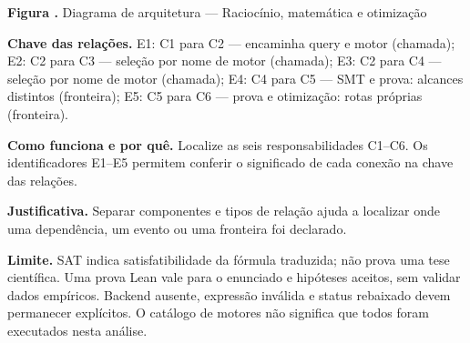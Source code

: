 {\small\textbf{Figura \thefigure.} Diagrama de arquitetura --- Raciocínio, matemática e otimização}\par\smallskip
{\footnotesize\textbf{Chave das relações.} E1: C1 para C2 --- encaminha query e motor (chamada); E2: C2 para C3 --- seleção por nome de motor (chamada); E3: C2 para C4 --- seleção por nome de motor (chamada); E4: C4 para C5 --- SMT e prova: alcances distintos (fronteira); E5: C5 para C6 --- prova e otimização: rotas próprias (fronteira).}\par\smallskip
\noindent\textbf{Como funciona e por quê.} Localize as seis responsabilidades C1--C6. Os identificadores E1--E5 permitem conferir o significado de cada conexão na chave das relações.\par
\noindent\textbf{Justificativa.} Separar componentes e tipos de relação ajuda a localizar onde uma dependência, um evento ou uma fronteira foi declarado.\par
\noindent\textbf{Limite.} SAT indica satisfatibilidade da fórmula traduzida; não prova uma tese científica. Uma prova Lean vale para o enunciado e hipóteses aceitos, sem validar dados empíricos. Backend ausente, expressão inválida e status rebaixado devem permanecer explícitos. O catálogo de motores não significa que todos foram executados nesta análise.\par\smallskip
{}
